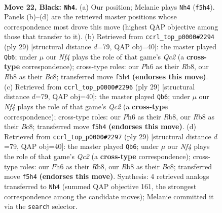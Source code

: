 \documentclass[11pt]{article}
\begin{document}
\clearpage

\begin{figure}[p]\centering
\begin{subfigure}{0.46\textwidth}\centering
\resizebox{\linewidth}{!}{%
\newchessgame
\chessboard[
  setfen={nrbr2k1/p3qpb1/7p/2p1pn1P/1p6/3PPB2/PPQB1P2/RN2NRK1 b - - 1 22},
  showmover=false,
  pgfstyle=straightmove, color=movearrow, markmove={f5-h4}
]}
\caption{}
\end{subfigure}\hfill
\begin{subfigure}{0.46\textwidth}\centering
\resizebox{\linewidth}{!}{%
\newchessgame
\chessboard[
  setfen={1rb1kb1r/2q2ppp/p2pp3/6BP/1n2PPn1/1NN5/1PPQ2P1/1K1R1B1R b k - 0 15},
  showmover=false,
  pgfstyle=straightmove, color=movearrow, markmove={c7-b6}
]}
\caption{}
\end{subfigure}
\\[4pt]
\begin{subfigure}{0.46\textwidth}\centering
\resizebox{\linewidth}{!}{%
\newchessgame
\chessboard[
  setfen={1rb1kb1r/2q2ppp/p2pp3/6BP/1n2PPn1/1NN5/1PPQ2P1/1K1R1B1R b k - 0 15},
  showmover=false,
  pgfstyle=straightmove, color=movearrow, markmove={c7-b6}
]}
\caption{}
\end{subfigure}\hfill
\begin{subfigure}{0.46\textwidth}\centering
\resizebox{\linewidth}{!}{%
\newchessgame
\chessboard[
  setfen={1rb1kb1r/2q2ppp/p2pp3/6BP/1n2PPn1/1NN5/1PPQ2P1/1K1R1B1R b k - 0 15},
  showmover=false,
  pgfstyle=straightmove, color=movearrow, markmove={c7-b6}
]}
\caption{}
\end{subfigure}
\caption{\textbf{Move 22, Black: \texttt{Nh4}.} (a) Our position; Melanie plays \texttt{Nh4} (\texttt{f5h4}). Panels (b)--(d) are the retrieved master positions whose correspondence most drove this move (highest QAP objective among those that transfer to it). (b) Retrieved from \texttt{ccrl\_top\_p0000\#2294} (ply 29) [structural distance $d$=79, QAP obj=40]: the master played \texttt{Qb6}; under $\mu$ our \emph{Nf4} plays the role of that game's \emph{Qc2} (a \textbf{cross-type} correspondence); cross-type roles: our \emph{P}h6 as their \emph{R}b8, our \emph{R}b8 as their \emph{B}c8; transferred move \texttt{f5h4} \textbf{(endorses this move)}. (c) Retrieved from \texttt{ccrl\_top\_p0000\#2296} (ply 29) [structural distance $d$=79, QAP obj=40]: the master played \texttt{Qb6}; under $\mu$ our \emph{Nf4} plays the role of that game's \emph{Qc2} (a \textbf{cross-type} correspondence); cross-type roles: our \emph{P}h6 as their \emph{R}b8, our \emph{R}b8 as their \emph{B}c8; transferred move \texttt{f5h4} \textbf{(endorses this move)}. (d) Retrieved from \texttt{ccrl\_top\_p0000\#2297} (ply 29) [structural distance $d$=79, QAP obj=40]: the master played \texttt{Qb6}; under $\mu$ our \emph{Nf4} plays the role of that game's \emph{Qc2} (a \textbf{cross-type} correspondence); cross-type roles: our \emph{P}h6 as their \emph{R}b8, our \emph{R}b8 as their \emph{B}c8; transferred move \texttt{f5h4} \textbf{(endorses this move)}. Synthesis: 4 retrieved analogs transferred to \texttt{Nh4} (summed QAP objective 161, the strongest correspondence among the candidate moves); Melanie committed it via the \texttt{search} selector.}
\label{fig:thought-m43}
\end{figure}
\end{document}
